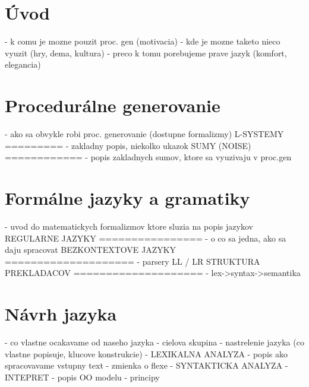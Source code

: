 

\chapter{Úvod}
	- k comu je mozne pouzit proc. gen (motivacia)
	- kde je mozne taketo nieco vyuzit (hry, dema, kultura)
	- preco k tomu porebujeme prave jazyk (komfort, elegancia)

\chapter{Procedurálne generovanie}
	- ako sa obvykle robi proc. generovanie (dostupne formalizmy)
	L-SYSTEMY
	=========
		- zakladny popis, niekolko ukazok
	SUMY (NOISE)
	============
		- popis zakladnych sumov, ktore sa vyuzivaju v proc.gen

\chapter{Formálne jazyky a gramatiky}
	- uvod do matematickych formalizmov ktore sluzia na popis jazykov
	REGULARNE JAZYKY
	================
		- o co sa jedna, ako sa daju spracovat
	BEZKONTEXTOVE JAZYKY
	====================
		- parsery LL / LR
	STRUKTURA PREKLADACOV
	====================
		- lex->syntax->semantika

\chapter{Návrh jazyka}
	- co vlastne ocakavame od naseho jazyka
	- cielova skupina
	- nastrelenie jazyka (co vlastne popisuje, klucove konstrukcie)
	- LEXIKALNA ANALYZA
		- popis ako spracovavame vstupny text
		- zmienka o flexe	
	- SYNTAKTICKA ANALYZA
	- INTEPRET
		- popis OO modelu
		- principy
	
